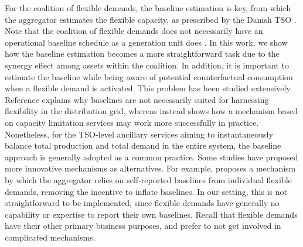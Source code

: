 \documentclass[conference]{IEEEtran}
\begin{document}
For the coalition of flexible demands, the baseline estimation is key, from which the aggregator estimates the flexible capacity, as prescribed by the Danish TSO \cite{energinet:prequalification}. Note that the coalition of flexible demands does not necessarily have an operational baseline schedule as a generation unit does \cite{gade2022ecosystem}.
%
In this work, we show how the baseline estimation becomes a more  straightforward task due to the synergy effect among assets within the coalition. In addition, it is important to estimate the baseline while being aware of potential counterfactual consumption when a flexible demand is activated. This problem has been studied extensively. Reference \cite{ziras2021baselines} explains why baselines are not necessarily suited for harnessing flexibility in the distribution grid, whereas \cite{capacity_limitation_services} instead shows how a mechanism based on capacity limitation services may work more successfully in practice. Nonetheless, for the TSO-level ancillary services aiming to instantaneously balance total production and total demand in the entire system, the baseline approach is generally adopted as a common practice. Some studies have proposed more innovative mechanisms as alternatives. For example,  \cite{muthirayan2019mechanism} proposes a mechanism by which the aggregator relies on self-reported baselines from individual flexible demands, removing the incentive to inflate baselines. In our setting, this is not straightforward to be implemented, since flexible demands have generally no capability or expertise to report their own baselines. Recall that flexible demands have their other primary business purposes, and prefer to not get involved in complicated mechanisms.



\end{document}
